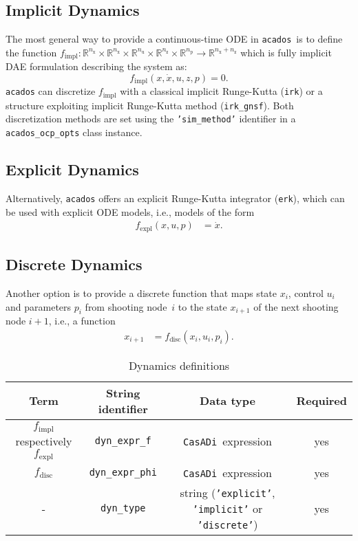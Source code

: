 \documentclass[english]{article}
\newcommand{\code}[1]{\texttt{#1}}
\newcommand{\str}[1]{\texttt{'#1'}}
\newcommand{\casadi}{\texttt{CasADi}}
\newcommand{\acados}{\texttt{acados}}
\newcommand{\ind}[1]{_{\textrm{#1}}}
\newcommand{\nx}{n\ind{x}}
\newcommand{\nuu}{n\ind{u}}
\newcommand{\nz}{n\ind{z}}
\newcommand{\np}{n\ind{p}}
\newcommand{\mandatory}{yes}
\begin{document}
\subsection{Implicit Dynamics}\label{sec:dynamics:implicit}
%
The most general way to provide a continuous-time ODE in \acados\ is to define the function $ f\ind{impl}: \mathbb{R}^{\nx}\times\mathbb{R}^{\nx}\times\mathbb{R}^{\nuu}\times\mathbb{R}^{\nz}\times\mathbb{R}^{\np} \rightarrow \mathbb{R}^{\nx+\nz}$ which is fully implicit DAE formulation describing the system as:
\begin{equation}
    f\ind{impl}(x, \dot{x}, u, z, p) = 0.\label{eq:dynamics:implicit}
\end{equation}
\acados{} can discretize $ f\ind{impl} $ with a classical implicit Runge-Kutta (\code{irk}) or a structure exploiting implicit Runge-Kutta method (\code{irk\_gnsf}). Both discretization methods are set using the \code{'sim\_method'} identifier in a \code{acados\_ocp\_opts} class instance.
%
\subsection{Explicit Dynamics}\label{sec:dynamics:explicit}
%
Alternatively, \acados{} offers an explicit Runge-Kutta integrator (\code{erk}), which can be used with explicit ODE models, i.e., models of the form
\begin{align}
f\ind{expl}(x,u,p) &= \dot{x}.\label{eq:dynamics:explicit}
\end{align}
%
\subsection{Discrete Dynamics}\label{sec:dynamics:discrete}
%
Another option is to provide a discrete function that maps state $x_i$, control $u_i$ and parameters $p_i$ from shooting node~$i$ to the state $x_{i+1}$ of the next shooting node $i+1$, i.e., a function
\begin{align}
x_{i+1} &= f\ind{disc}(x_i,u_i,p_i).\label{eq:dynamics:discrete}
\end{align}
%
\begin{table}[ht!]
    \centering
    \caption{Dynamics definitions} \label{tab:dynamics}
    \begin{tabular}{cccc}
        \toprule
        Term & String identifier & Data type & Required \\ \midrule
        $ f\ind{impl} $ respectively $ f\ind{expl} $ & \code{dyn\_expr\_f}    & \casadi~expression & \mandatory \\
        $f\ind{disc}$ & \code{dyn\_expr\_phi} & \casadi~expression & \mandatory \\
        - & \code{dyn\_type}    & string (\str{explicit}, \str{implicit} or \str{discrete}) & \mandatory \\
        \bottomrule
    \end{tabular}
\end{table}
%
\end{document}
